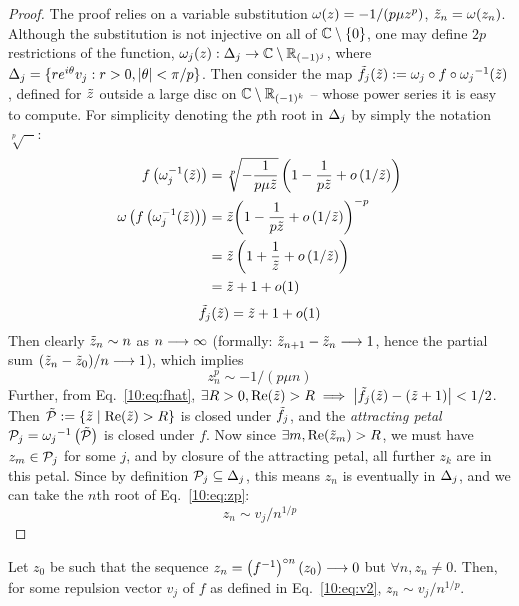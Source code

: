 \documentclass[../main.tex]{subfiles}
\begin{document}
\begin{proof}
    The proof relies on a variable substitution $\omega(z)=-1/(p \mu z^p)$, $\tilde{z}_n=\omega(z_n)$. Although the substitution is not injective on all of
    $\mathbb{C}\setminus\{0\}$, one may define $2p$ restrictions of the function, $\omega_j(z):\Delta_j\to\mathbb{C}\setminus\mathbb{R}_{(-1)^j}$, where $\Delta_j=\{re^{i\theta}v_j : r>0, \left|\theta\right| < \pi/p \}$. Then consider the map $\tilde{f}_j(\tilde{z}):=\omega_j \circ f \circ {\omega_j}^{-1}(\tilde{z})$, defined for $\tilde{z}$ outside a large disc on $\mathbb{C}\setminus\mathbb{R}_{(-1)^k}$ -- whose power series it is easy to compute. For simplicity denoting the $p$th root in $\Delta_j$ by simply the notation $\sqrt[p]{-}$:
    \begin{align}
        \label{10:eq:fhat}
        f\left(\omega_j^{-1}(\tilde{z})\right) &
        = \sqrt[p]{-\frac{1}{p\mu \tilde{z}}}\left(1 - \frac{1}{p\tilde{z}} + o\left(1/\tilde{z} \right)\right)\\
        \omega \left(f\left(\omega_j^{-1}(\tilde{z})\right) \right) &
        = \tilde{z}{\left(1 - \frac{1}{p\tilde{z}} + o\left( {1/\tilde{z}}\right)\right)^{ - p}}\\
        &=\tilde{z}\left(1 + \frac{1}{\tilde{z}} + o\left( {1/\tilde{z}} \right)\right)\\
        &= \tilde{z} + 1 + o(1)
    \end{align}
    \begin{equation}
        \label{10:eq:fhat}
        \tilde{f}_j(\tilde{z}) = \tilde{z} + 1 + o(1)
    \end{equation}
    Then clearly $\tilde{z}_n\sim n$ as $n\longrightarrow\infty$ (formally: $\tilde{z}_{n+1}-\tilde{z}_n\longrightarrow 1$, hence the partial sum $(\tilde{z}_n-\tilde{z}_0)/n\longrightarrow 1$), which implies 
    \begin{equation}
        \label{10:eq:zp}
        z_n^p\sim -1/(p\mu n)
    \end{equation}
    Further, from Eq.~\ref{10:eq:fhat}, $\exists R > 0, \mathrm{Re}(\tilde{z})>R \implies \left|\tilde{f}_j(\tilde{z})-(\tilde{z}+1)\right|<1/2$. Then $\tilde{\mathcal{P}}:=\{\tilde{z}\mid\mathrm{Re}(\tilde{z})>R\}$ is closed under $\tilde{f}_j$, and the \emph{attracting petal} $\mathcal{P}_j={\omega_j}^{-1}\left(\tilde{\mathcal{P}}\right)$ is closed under $f$. Now since $\exists m, \mathrm{Re}(\tilde{z}_m)>R$, we must have $z_m\in \mathcal{P}_j$ for some $j$, and by closure of the attracting petal, all further $z_k$ are in this petal. Since by definition $\mathcal{P}_j\subseteq\Delta_j$, this means $z_n$ is eventually in $\Delta_j$, and we can take the $n$th root of Eq.~\ref{10:eq:zp}:
    \begin{equation}
        \label{10:eq:z}
        z_n \sim v_j/n^{1/p}
    \end{equation}
\end{proof}
\begin{cor}
    \label{10:cor:arvec-ir-inv}
    Let $z_0$ be such that the sequence $z_n=\left(f^{-1}\right)^{\circ n}(z_0)\longrightarrow 0$ but $\forall n, z_n\ne 0$. Then, for some repulsion vector $v_j$ of $f$ as defined in Eq.~\ref{10:eq:v2}, $z_n\sim v_j/n^{1/p}$.
\end{cor}
\end{document}
